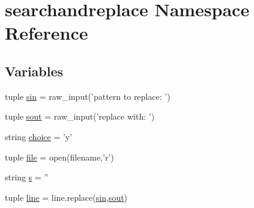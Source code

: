 \hypertarget{namespacesearchandreplace}{
\section{searchandreplace Namespace Reference}
\label{namespacesearchandreplace}
}
\subsection*{Variables}
\begin{DoxyCompactItemize}
\item 
tuple \hyperlink{namespacesearchandreplace_ac33fb7c76f53a315493ecc066a38886c}{sin} = raw\_\-input('pattern to replace: ')
\item 
tuple \hyperlink{namespacesearchandreplace_a80a2bb71737fb98d8f4d045dcb7d12c6}{sout} = raw\_\-input('replace with: ')
\item 
string \hyperlink{namespacesearchandreplace_a0f3f5f20522c2bb1eff96f3a115fb82e}{choice} = 'y'
\item 
tuple \hyperlink{namespacesearchandreplace_a6cd74b7607c6c6d298075b8caec8fc5b}{file} = open(filename,'r')
\item 
string \hyperlink{namespacesearchandreplace_a24bb4d92427daa0fb9ba6dbcbc8c6c01}{s} = ''
\item 
tuple \hyperlink{namespacesearchandreplace_ab44b2db3542d0e3fcab9386cb031b3f9}{line} = line.replace(\hyperlink{namespacesearchandreplace_ac33fb7c76f53a315493ecc066a38886c}{sin},\hyperlink{namespacesearchandreplace_a80a2bb71737fb98d8f4d045dcb7d12c6}{sout})
\end{DoxyCompactItemize}


